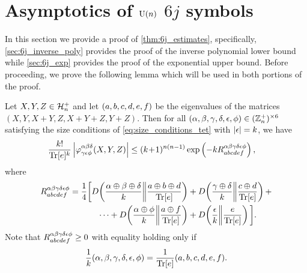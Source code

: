 \documentclass[notitlepage, 11pt, letterpaper]{amsart}
\begin{document}
\section{Asymptotics of \texorpdfstring{$\operatorname{U}(n)$ $6j$}{U(n) 6j} symbols}
\label{sec:proof_6j_estimates}

In this section we provide a proof of \cref{thm:6j_estimates},
specifically, \cref{sec:6j_inverse_poly} provides the proof of the inverse polynomial lower bound while \cref{sec:6j_exp} provides the proof of the exponential upper bound.
Before proceeding, we prove the following lemma which will be used in both portions of the proof.
\begin{lem}
    \label{lem:asym_sixj_helper}
    Let $X,Y,Z \in \mathcal H^{+}_{n}$ and let $(a,b,c,d,e,f)$ be the eigenvalues of the matrices $(X, Y, X+Y, Z, X+Y+Z,Y+Z)$.
    Then for all $(\alpha,\beta,\gamma,\delta,\epsilon,\phi) \in (\mathbb Z^{+}_{n})^{\times 6}$ satisfying the size conditions of \cref{eq:size_conditions_tet} with $\left|\epsilon\right| = k$, we have
    \begin{align}
        \label{eq:hex_rel_ent_bound}
        \frac{k!}{\operatorname{Tr}[e]^k}\left|\varphi^{\alpha\beta\delta}_{\gamma\epsilon\phi}(X,Y,Z)\right|
        &\leq (k\!+\!1)^{n(n-1)} \exp\left(- k R_{abcdef}^{\alpha\beta\gamma\delta\epsilon\phi}\right),
    \end{align}
    where
    \begin{align}
        \begin{split}
            R_{abcdef}^{\alpha\beta\gamma\delta\epsilon\phi}
            = \frac{1}{4}\bigg[
            D\!\left(\frac{\alpha \oplus \beta \oplus \delta}{k}\middle\|\frac{a\oplus b \oplus d}{\operatorname{Tr}[e]}\right)
            &+ D\!\left(\frac{\gamma \oplus \delta}{k}\middle\|\frac{c \oplus d}{\operatorname{Tr}[e]}\right)+ \\
            \cdots + D\!\left(\frac{\alpha \oplus \phi}{k}\middle\|\frac{a\oplus f}{\operatorname{Tr}[e]}\right)
            &+ D\!\left(\frac{\epsilon}{k}\middle\|\frac{e}{\operatorname{Tr}[e]}\right)
            \bigg].
        \end{split}
    \end{align}
    Note that $R_{abcdef}^{\alpha\beta\gamma\delta\epsilon\phi} \geq 0$ with equality holding only if
    \begin{equation}
        \frac{1}{k} (\alpha, \beta, \gamma, \delta, \epsilon, \phi)
        =
        \frac{1}{\operatorname{Tr}[e]} (a, b, c, d, e, f).
    \end{equation}
\end{lem}
\end{document}
